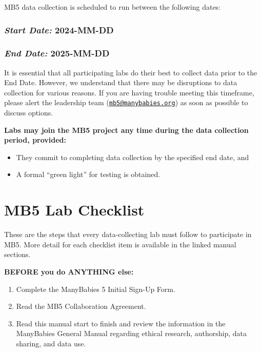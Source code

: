 \documentclass[
]{book}
\providecommand{\tightlist}{%
  \setlength{\itemsep}{0pt}\setlength{\parskip}{0pt}}
\begin{document}
MB5 data collection is scheduled to run between the following dates:

\subsubsection*{\texorpdfstring{\emph{Start Date:} \textbf{2024-MM-DD}}{Start Date: 2024-MM-DD}}\label{start-date-2024-mm-dd}

\subsubsection*{\texorpdfstring{\emph{End Date:} \textbf{2025-MM-DD}}{End Date: 2025-MM-DD}}\label{end-date-2025-mm-dd}

It is essential that all participating labs do their best to collect data prior to the End Date. However, we understand that there may be disruptions to data collection for various reasons. If you are having trouble meeting this timeframe, please alert the leadership team (\href{mailto:mb5@manybabies.org}{\nolinkurl{mb5@manybabies.org}}) as soon as possible to discuss options.

\textbf{Labs may join the MB5 project any time during the data collection period, provided:}

\begin{itemize}
\tightlist
\item
  They commit to completing data collection by the specified end date, and
\item
  A formal ``green light'' for testing is obtained.
\end{itemize}

\section*{MB5 Lab Checklist}\label{mb5-lab-checklist}

These are the steps that every data-collecting lab must follow to participate in MB5. More detail for each checklist item is available in the linked manual sections.

\textbf{BEFORE you do ANYTHING else:}

\begin{enumerate}
\def\labelenumi{\arabic{enumi}.}
\tightlist
\item
  Complete the ManyBabies 5 Initial Sign-Up Form.
\item
  Read the MB5 Collaboration Agreement.
\item
  Read this manual start to finish and review the information in the ManyBabies General Manual regarding ethical research, authorship, data sharing, and data use.
\end{enumerate}
\end{document}
